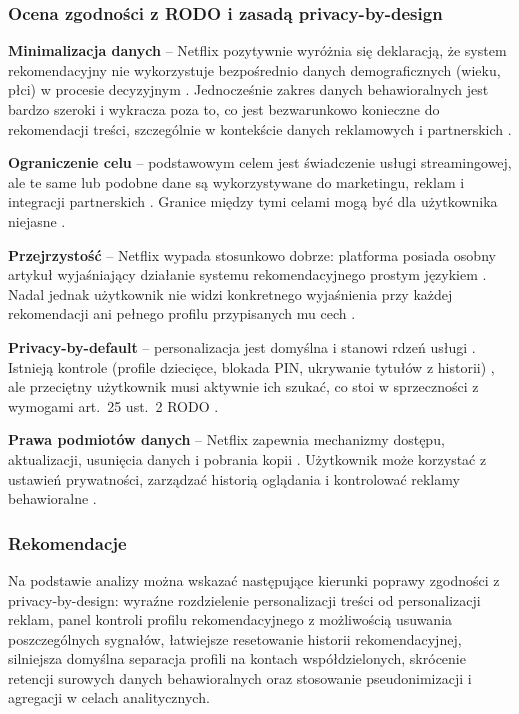 \documentclass[12pt, a4paper]{article}
\begin{document}
\subsubsection{Ocena zgodności z RODO i zasadą privacy-by-design}

\textbf{Minimalizacja danych} -- Netflix pozytywnie wyróżnia się deklaracją, że system rekomendacyjny nie wykorzystuje bezpośrednio danych demograficznych (wieku, płci) w procesie decyzyjnym \cite{netflix_recs}. Jednocześnie zakres danych behawioralnych jest bardzo szeroki i wykracza poza to, co jest bezwarunkowo konieczne do rekomendacji treści, szczególnie w kontekście danych reklamowych i partnerskich \cite{netflix_privacy, rodo}.

\textbf{Ograniczenie celu} -- podstawowym celem jest świadczenie usługi streamingowej, ale te same lub podobne dane są wykorzystywane do marketingu, reklam i integracji partnerskich \cite{netflix_privacy}. Granice między tymi celami mogą być dla użytkownika niejasne \cite{chen2025}.

\textbf{Przejrzystość} -- Netflix wypada stosunkowo dobrze: platforma posiada osobny artykuł wyjaśniający działanie systemu rekomendacyjnego prostym językiem \cite{netflix_recs}. Nadal jednak użytkownik nie widzi konkretnego wyjaśnienia przy każdej rekomendacji ani pełnego profilu przypisanych mu cech \cite{edpb2019}.

\textbf{Privacy-by-default} -- personalizacja jest domyślna i stanowi rdzeń usługi \cite{netflix_recs}. Istnieją kontrole (profile dziecięce, blokada PIN, ukrywanie tytułów z historii) \cite{netflix_stop}, ale przeciętny użytkownik musi aktywnie ich szukać, co stoi w sprzeczności z wymogami art.~25 ust.~2 RODO \cite{rodo, edpb2019}.

\textbf{Prawa podmiotów danych} -- Netflix zapewnia mechanizmy dostępu, aktualizacji, usunięcia danych i pobrania kopii \cite{netflix_data}. Użytkownik może korzystać z ustawień prywatności, zarządzać historią oglądania i kontrolować reklamy behawioralne \cite{netflix_stop}.

\subsubsection{Rekomendacje}

Na podstawie analizy można wskazać następujące kierunki poprawy zgodności z privacy-by-design: wyraźne rozdzielenie personalizacji treści od personalizacji reklam, panel kontroli profilu rekomendacyjnego z możliwością usuwania poszczególnych sygnałów, łatwiejsze resetowanie historii rekomendacyjnej, silniejsza domyślna separacja profili na kontach współdzielonych, skrócenie retencji surowych danych behawioralnych oraz stosowanie pseudonimizacji i agregacji w celach analitycznych.
\end{document}
